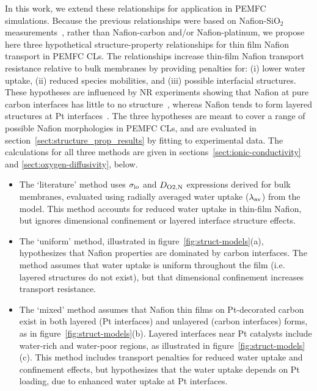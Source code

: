 \documentclass[final,3p,times,twocolumn]{elsarticle}    %
\newcommand{\crr}[1]{\color{red} #1 \color{black}}
\newcommand{\scd}[1]{\color{red} #1 \color{black}}%
\begin{document}
{In this work, we extend these relationships for application in PEMFC simulations. Because the previous relationships were based on Nafion-SiO$_2$  measurements~\cite{bib:paul_mccreery_2014, bib:decaluwe_2018}, rather than Nafion-carbon and/or Nafion-platinum, we} \crr{propose here three hypothetical structure-property relationships for thin film Nafion transport in PEMFC CLs. The relationships increase thin-film Nafion transport resistance relative to bulk membranes by providing penalties for: (i) lower water uptake, (ii) reduced species mobilities, and (iii) possible interfacial structures.}\scd{ These hypotheses are influenced by NR experiments showing that Nafion at pure carbon interfaces has little to no structure~\cite{bib:wood_2009, bib:ito_2020}, whereas Nafion tends to form layered structures at Pt interfaces~\cite{bib:wood_2009, bib:dura_2009, bib:shrivastava_2018}. The three hypotheses are meant to cover a range of possible Nafion morphologies in PEMFC CLs, and are evaluated in section~\ref{sect:structure_prop_results} by fitting to experimental data. The calculations for all three methods are given in sections~\ref{sect:ionic-conductivity} and \ref{sect:oxygen-diffusivity}, below.
\begin{itemize}
    \item The `literature' method uses $\sigma_{\rm io}$ and $D_{\rm O2, N}$ expressions derived for bulk membranes, evaluated using radially averaged water uptake ($\lambda_{\rm av}$) from the model. This method accounts for reduced water uptake in thin-film Nafion, but ignores dimensional confinement or layered interface structure effects.

    \item The `uniform' method, illustrated in figure~\ref{fig:struct-models}(a), hypothesizes that Nafion properties are dominated by carbon interfaces. The method assumes that water uptake is uniform throughout the film (i.e. layered structures do not exist), but that dimensional confinement increases transport resistance.
    
    \item  The `mixed' method assumes that Nafion thin films on Pt-decorated carbon exist in both layered (Pt interfaces) and unlayered (carbon interfaces) forms, as in figure~\ref{fig:struct-models}(b). Layered interfaces near Pt catalysts include water-rich and water-poor regions, as illustrated in figure~\ref{fig:struct-models}(c). This method includes transport penalties for reduced water uptake and confinement effects, but hypothesizes that the water uptake depends on Pt loading, due to enhanced water uptake at Pt interfaces.
\end{itemize}}
\end{document}
